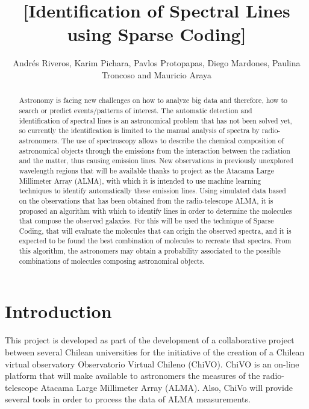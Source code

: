\documentclass[twocolumn, draft]{emulateapj}
\begin{document}
\title{[Identification of Spectral Lines using Sparse Coding]}
\author{Andr\'es Riveros,
		Karim Pichara,
		Pavlos Protopapas,
		Diego Mardones,
		Paulina Troncoso and
		Mauricio Araya}

\begin{abstract}
Astronomy is facing new challenges on how to analyze big data and therefore, how to search or predict events/patterns of interest. The automatic detection and identification of spectral lines is an astronomical problem that has not been solved yet, so currently the identification is limited to the manual analysis of spectra by radio-astronomers. The use of spectroscopy allows to describe the chemical composition of astronomical objects through the emissions from the interaction between the radiation and the matter, thus causing emission lines. New observations in previously unexplored wavelength regions that will be available thanks to project as the Atacama Large Millimeter Array (ALMA), with which it is intended to use machine learning techniques to identify automatically these emission lines. Using simulated data based on the observations that has been obtained from the radio-telescope ALMA, it is proposed an algorithm with which to identify lines in order to determine the molecules that compose the observed galaxies. For this will be used the technique of Sparse Coding, that will evaluate the molecules that can origin the observed spectra, and it is expected to be found the best combination of molecules to recreate that spectra. From this algorithm, the astronomers may obtain a probability associated to the possible combinations of molecules composing astronomical objects.
\end{abstract}


\section{Introduction}

This project is developed as part of the development of a collaborative project between several Chilean universities
for the initiative of the creation of a Chilean virtual observatory Observatorio Virtual Chileno (ChiVO).
ChiVO is an on-line platform that will make available to astronomers the measures of the radio-telescope Atacama
Large Millimeter Array (ALMA). Also, ChiVo will provide several tools in order to process the data of ALMA measurements.
\end{document}
